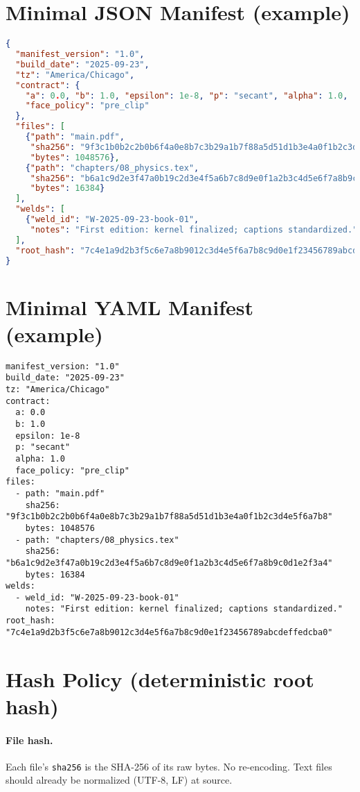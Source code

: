 \section{Minimal JSON Manifest (example)}
\label{sec:manifest-json}

\begin{lstlisting}[language=json,caption={Example manifest (JSON).},label={lst:manifest-json}]
{
  "manifest_version": "1.0",
  "build_date": "2025-09-23",
  "tz": "America/Chicago",
  "contract": {
    "a": 0.0, "b": 1.0, "epsilon": 1e-8, "p": "secant", "alpha": 1.0,
    "face_policy": "pre_clip"
  },
  "files": [
    {"path": "main.pdf",
     "sha256": "9f3c1b0b2c2b0b6f4a0e8b7c3b29a1b7f88a5d51d1b3e4a0f1b2c3d4e5f6a7b8",
     "bytes": 1048576},
    {"path": "chapters/08_physics.tex",
     "sha256": "b6a1c9d2e3f47a0b19c2d3e4f5a6b7c8d9e0f1a2b3c4d5e6f7a8b9c0d1e2f3a4",
     "bytes": 16384}
  ],
  "welds": [
    {"weld_id": "W-2025-09-23-book-01",
     "notes": "First edition: kernel finalized; captions standardized."}
  ],
  "root_hash": "7c4e1a9d2b3f5c6e7a8b9012c3d4e5f6a7b8c9d0e1f23456789abcdeffedcba0"
}
\end{lstlisting}

\section{Minimal YAML Manifest (example)}
\label{sec:manifest-yaml}

\begin{lstlisting}[caption={Example manifest (YAML).},label={lst:manifest-yaml}]
manifest_version: "1.0"
build_date: "2025-09-23"
tz: "America/Chicago"
contract:
  a: 0.0
  b: 1.0
  epsilon: 1e-8
  p: "secant"
  alpha: 1.0
  face_policy: "pre_clip"
files:
  - path: "main.pdf"
    sha256: "9f3c1b0b2c2b0b6f4a0e8b7c3b29a1b7f88a5d51d1b3e4a0f1b2c3d4e5f6a7b8"
    bytes: 1048576
  - path: "chapters/08_physics.tex"
    sha256: "b6a1c9d2e3f47a0b19c2d3e4f5a6b7c8d9e0f1a2b3c4d5e6f7a8b9c0d1e2f3a4"
    bytes: 16384
welds:
  - weld_id: "W-2025-09-23-book-01"
    notes: "First edition: kernel finalized; captions standardized."
root_hash: "7c4e1a9d2b3f5c6e7a8b9012c3d4e5f6a7b8c9d0e1f23456789abcdeffedcba0"
\end{lstlisting}

\section{Hash Policy (deterministic root hash)}
\label{sec:manifest-hash}

\paragraph{File hash.} Each file’s \texttt{sha256} is the SHA-256 of its raw bytes. No re-encoding. Text files should already be normalized (UTF-8, LF) at source.

